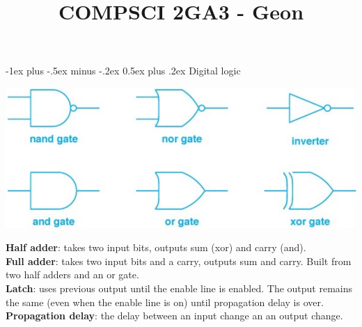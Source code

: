 \documentclass[10pt,landscape]{article}
\title{COMPSCI 2GA3 - Geon}
\makeatletter
\renewcommand{\section}{\@startsection{section}{1}{0mm}%
                                {-1ex plus -.5ex minus -.2ex}%
                                {0.5ex plus .2ex}%
                                {\normalfont\small\bfseries}}
\makeatother
\begin{document}
\raggedright
\footnotesize

\tiny\begin{multicols}{3}
\setlength{\premulticols}{1pt}
\setlength{\postmulticols}{1pt}
\setlength{\multicolsep}{3pt}
\setlength{\columnsep}{2pt}

\section{Digital logic}
{\centering\includegraphics[scale=0.23]{img/lg.png}\par} 
\textbf{Half adder}: takes two input bits, outputs sum (xor) and carry (and).\\
\textbf{Full adder}: takes two input bits and a carry, outputs sum and carry. Built from two half adders and an or gate.\\
\textbf{Latch}: uses previous output until the enable line is enabled. The output remains the same (even when the enable line is on) until propagation delay is over.\\
\textbf{Propagation delay}: the delay between an input change an an output change.\\

\end{multicols}
\end{document}
